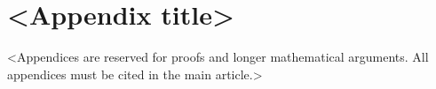 \documentclass[french,english,review]{cjs-rcs-article}
\begin{document}
\makebackmatter                 %

\appendix                       %

\section{<Appendix title>}

<Appendices are reserved for proofs and longer mathematical
arguments. All appendices must be cited in the main article.>


\end{document}
